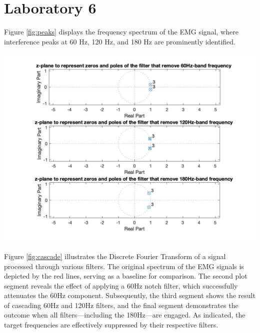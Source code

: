 \documentclass[8pt]{article}  %
\theoremstyle{plain}
\theoremstyle{definition}
\theoremstyle{remark}
\begin{document}
\begin{minipage}{0.49\textwidth}
    \label{fig:window}
    \end{minipage}




    \newpage
    \section{Laboratory 6}
    \begin{minipage}{0.49\textwidth}
        Figure \ref{fig:peaks} displays the frequency spectrum of the EMG signal, 
        where interference peaks at 60 Hz, 120 Hz, and 180 Hz are prominently identified. \\

        \vspace{0.3cm}


        \includegraphics[width=\linewidth]{figure/figure_9.jpg}
        \label{fig:z_plane}

        \vspace{0.3cm}

        Figure \ref{fig:cascade} illustrates the Discrete Fourier Transform of a signal processed through various filters. 
        The original spectrum of the EMG signals is depicted by the red lines, serving as a baseline for comparison. 
        The second plot segment reveals the effect of applying a 60Hz notch filter, which successfully attenuates the 60Hz component. 
        Subsequently, the third segment shows the result of cascading 60Hz and 120Hz filters, 
        and the final segment demonstrates the outcome when all filters—including the 180Hz—are engaged. 
        As indicated, the target frequencies are effectively suppressed by their respective filters.\\
    \end{minipage}
\end{document}
